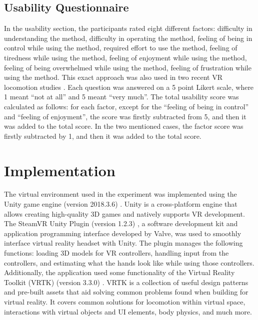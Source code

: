 \subsection{Usability Questionnaire}

In the usability section, the participants rated eight different factors: difficulty in understanding the method, difficulty in operating the method, feeling of being in control while using the method, required effort to use the method, feeling of tiredness while using the method, feeling of enjoyment while using the method, feeling of being overwhelmed while using the method, feeling of frustration while using the method. This exact approach was also used in two recent VR locomotion studies \cite{TELEPORTATIONSTUDY}\cite{NODEBASEDTELEPORTATION}. Each question was answered on a 5 point Likert scale, where 1 meant ``not at all'' and 5 meant ``very much''. The total usability score was calculated as follows: for each factor, except for the ``feeling of being in control'' and ``feeling of enjoyment'', the score was firstly subtracted from 5, and then it was added to the total score. In the two mentioned cases, the factor score was firstly subtracted by 1, and then it was added to the total score.

\section{Implementation}

The virtual environment used in the experiment was implemented using the Unity game engine (version 2018.3.6) \cite{UNITY}. Unity is a cross-platform engine that allows creating high-quality 3D games and natively supports VR development. The SteamVR Unity Plugin (version 1.2.3) \cite{STEAMVR}, a software development kit and application programming interface developed by Valve, was used to smoothly interface virtual reality headset with Unity. The plugin manages the following functions: loading 3D models for VR controllers, handling input from the controllers, and estimating what the hands look like while using those controllers. Additionally, the application used some functionality of the Virtual Reality Toolkit (VRTK) (version 3.3.0) \cite{VRTK}. VRTK is a collection of useful design patterns and pre-built assets that aid solving common problems found when building for virtual reality. It covers common solutions for locomotion within virtual space, interactions with virtual objects and UI elements, body physics, and much more. 

